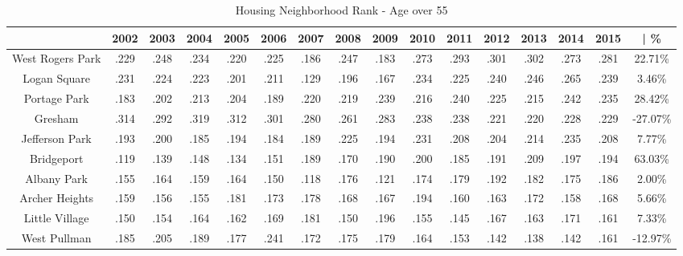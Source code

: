 \documentclass{article}
\theoremstyle{definition}
\theoremstyle{remark}
\begin{document}
\begin{table}[h]\centering
\caption{Housing Neighborhood Rank - Age over 55}\label{thelabel}
\begin{adjustbox}{center}
\begin{tabular}{||c | c c c c c c c c c c c c c c | c ||} 
 \hline
 & 2002 & 2003 & 2004 & 2005 & 2006 & 2007 & 2008 & 2009 & 2010 & 2011 & 2012 & 2013 & 2014 & 2015 & | \%\\[0.5ex] 
 \hline\hline
West Rogers Park & .229 & .248 & .234 & .220 & .225 & .186 & .247 & .183 & .273 & .293 & .301 & .302 & .273 & .281 & 22.71\% \\
Logan Square & .231 & .224 & .223 & .201 & .211 & .129 & .196 & .167 & .234 & .225 & .240 & .246 & .265 & .239 & 3.46\% \\
Portage Park & .183 & .202 & .213 & .204 & .189 & .220 & .219 & .239 & .216 & .240 & .225 & .215 & .242 & .235 & 28.42\% \\
Gresham & .314 & .292 & .319 & .312 & .301 & .280 & .261 & .283 & .238 & .238 & .221 & .220 & .228 & .229 & -27.07\% \\
Jefferson Park & .193 & .200 & .185 & .194 & .184 & .189 & .225 & .194 & .231 & .208 & .204 & .214 & .235 & .208 & 7.77\% \\
Bridgeport & .119 & .139 & .148 & .134 & .151 & .189 & .170 & .190 & .200 & .185 & .191 & .209 & .197 & .194 & 63.03\% \\
Albany Park & .155 & .164 & .159 & .164 & .150 & .118 & .176 & .121 & .174 & .179 & .192 & .182 & .175 & .186 & 2.00\% \\
Archer Heights & .159 & .156 & .155 & .181 & .173 & .178 & .168 & .167 & .194 & .160 & .163 & .172 & .158 & .168 & 5.66\% \\
Little Village & .150 & .154 & .164 & .162 & .169 & .181 & .150 & .196 & .155 & .145 & .167 & .163 & .171 & .161 & 7.33\% \\
West Pullman & .185 & .205 & .189 & .177 & .241 & .172 & .175 & .179 & .164 & .153 & .142 & .138 & .142 & .161 & -12.97\% \\
 \hline
 \end{tabular}

\end{adjustbox}
\end{table}
\end{document}
